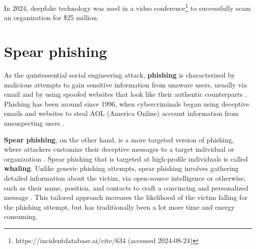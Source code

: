 In 2024, deepfake technology was used in a video conference\footnote{https://incidentdatabase.ai/cite/634 (accessed 2024-08-24)} to successfully scam an organization for \$25 million.
















\section{Spear phishing}
\begin{comment}
Phishing & spear phishing

What to cover:
    - What is phishing (via email and ALSO other means)
    - Spear phishing a more targeted form of phishing
    - How ChatGPT can be used to improve scam messages
    - ChatGPT:n eettisten ohjeistusten ohittaminen on jo käsitelty kohdassa Chatbots

\end{comment}

As the quintessential social engineering attack, \textbf{phishing} is characterized by malicious attempts to gain sensitive information from unaware users, usually via email and by using spoofed websites that look like their authentic counterparts \citep{basitComprehensiveSurveyAIenabledPhishingAttacks2021}. Phishing has been around since 1996, when cybercriminals began using deceptive emails and websites to steal AOL (America Online) account information from unsuspecting users \citep{wangDefiningSocialEngineering2020}.


\textbf{Spear phishing}, on the other hand, is a more targeted version of phishing, where attackers customize their deceptive messages to a target individual or organization \citep{basitComprehensiveSurveyAIenabledPhishingAttacks2021, fakhouriAIDrivenSolutionsForSocialEngineeringAttacks2024}. Spear phishing that is targeted at high-profile individuals is called \textbf{whaling}. Unlike generic phishing attempts, spear phishing involves gathering detailed information about the victim, via open-source intelligence or otherwise, such as their name, position, and contacts to craft a convincing and personalized message \citep{salahdineSocialEngineeringAttacks2019}. This tailored approach increases the likelihood of the victim falling for the phishing attempt, but has traditionally been a lot more time and energy consuming.


